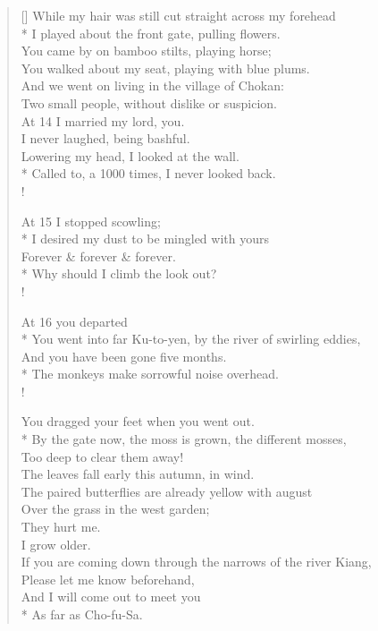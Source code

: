 \documentclass[MAIN]{subfiles}
\begin{document}
\settowidth{\versewidth}{While my hair was still cut straight across my forehead}
\begin{verse}[\versewidth]
While my hair was still cut straight across my forehead\\*
I played about the front gate, pulling flowers.\\ 
You came by on bamboo stilts, playing horse;\\
You walked about my seat, playing with blue plums.\\
And we went on living in the village of {\sc Chokan}:\\
Two small people, without dislike or suspicion.\\
At 14 I married my lord, you.\\
I never laughed, being bashful.\\
Lowering my head, I looked at the wall.\\*
Called to, a 1000 times, I never looked back.\\!

At 15 I stopped scowling;\\*
I desired my dust to be mingled with yours\\
Forever \& forever \& forever.\\*
Why should I climb the look out?\\!

At 16 you departed\\*
You went into far {\sc Ku-to-yen}, by the river of swirling eddies,\\
And you have been gone five months.\\*
The monkeys make sorrowful noise overhead.\\!

You dragged your feet when you went out.\\*
By the gate now, the moss is grown, the different mosses,\\
Too deep to clear them away!\\
The leaves fall early this autumn, in wind.\\
The paired butterflies are already yellow with august\\
Over the grass in the west garden;\\
They hurt me.\\
I grow older.\\
If you are coming down through the narrows of the river {\sc Kiang},\\
Please let me know beforehand,\\
And I will come out to meet you\\*
\vin \vin As far as {\sc Cho-fu-Sa}.
\end{verse}
\end{document}
